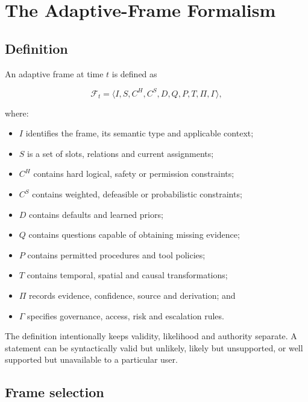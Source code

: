 \documentclass[11pt,a4paper]{article}
\newcommand{\Frame}{\mathcal{F}}
\begin{document}
\section{The Adaptive-Frame Formalism}

\subsection{Definition}

An adaptive frame at time $t$ is defined as

\begin{equation}
\Frame_t = \langle I,S,C^{H},C^{S},D,Q,P,T,\Pi,\Gamma \rangle,
\label{eq:frame}
\end{equation}

where:

\begin{itemize}
  \item $I$ identifies the frame, its semantic type and applicable context;
  \item $S$ is a set of slots, relations and current assignments;
  \item $C^{H}$ contains hard logical, safety or permission constraints;
  \item $C^{S}$ contains weighted, defeasible or probabilistic constraints;
  \item $D$ contains defaults and learned priors;
  \item $Q$ contains questions capable of obtaining missing evidence;
  \item $P$ contains permitted procedures and tool policies;
  \item $T$ contains temporal, spatial and causal transformations;
  \item $\Pi$ records evidence, confidence, source and derivation; and
  \item $\Gamma$ specifies governance, access, risk and escalation rules.
\end{itemize}

The definition intentionally keeps validity, likelihood and authority separate.
A statement can be syntactically valid but unlikely, likely but unsupported, or
well supported but unavailable to a particular user.

\subsection{Frame selection}
\end{document}
